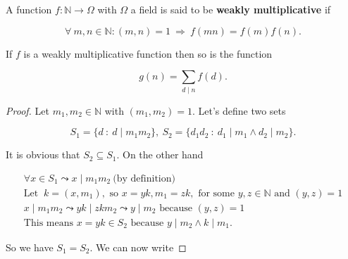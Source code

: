\begin{defn}
A function $f:\mathbb{N} \rightarrow \Omega$ with $\Omega$ a field is said to be \textbf{weakly multiplicative} if

\[
	\forall \ m, n \in \mathbb{N}: (m, n) = 1 \ \Rightarrow \ f(mn) = f(m) f(n).
\]
\end{defn}

\begin{thm}
If $f$ is a weakly multiplicative function then so is the function

\[
	g(n) = \sum_{d \mid n} f(d).
\]
\end{thm}

\begin{proof}
	
Let $m_1,m_2 \in \mathbb{N}$ with $(m_1, m_2) = 1$. Let's define two sets

\[
	S_1 = \{ d\ :\ d \mid m_1 m_2 \}, \ S_2 = \{ d_1 d_2\ :\ d_1 \mid m_1 \wedge d_2 \mid m_2 \}.
\]		

\noindent It is obvious that $S_2 \subseteq S_1$. On the other hand

\[
	\begin{array}{l}
	              \forall x \in S_1 \leadsto x \mid m_1 m_2 \ \mbox{(by definition)} \\
	              \mbox{Let } \ k = (x, m_1), \mbox{ so } x = y k, m_1 = z k,  \mbox{ for some } y, z \in \mathbb{N} \mbox{ and } (y, z) = 1 \\
	              x \mid m_1 m_2 \leadsto y k \mid z k m_2 \leadsto y \mid m_2 \mbox{ because } (y, z) = 1\\
	              \mbox{This means } x = y k \in S_2 \mbox{ because } y \mid m_2 \wedge k \mid m_1.
	 \end{array}       
\]

\noindent So we have $S_1 = S_2$. We can now write


\end{proof}
